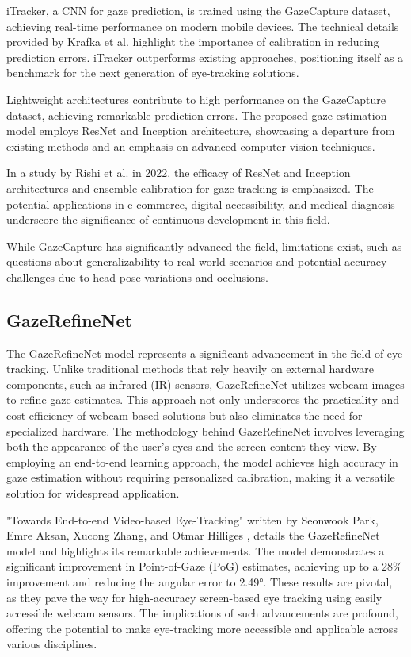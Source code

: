 \documentclass[conference]{IEEEtran}
\begin{document}
iTracker\cite{gazecapture-1}, a CNN for gaze prediction, is trained using the GazeCapture dataset, achieving real-time performance on modern mobile devices. The technical details provided by Krafka et al. highlight the importance of calibration in reducing prediction errors\cite{gazecapture-1}. iTracker outperforms existing approaches\cite{review_benchmark}, positioning itself as a benchmark for the next generation of eye-tracking solutions.

Lightweight architectures contribute to high performance on the GazeCapture dataset, achieving remarkable prediction errors. The proposed gaze estimation model employs ResNet and Inception architecture\cite{gazecapture-2}, showcasing a departure from existing methods and an emphasis on advanced computer vision techniques. 

In a study by Rishi et al. in 2022, the efficacy of ResNet and Inception architectures\cite{gazecapture-2} and ensemble calibration for gaze tracking is emphasized. The potential applications in e-commerce, digital accessibility, and medical diagnosis underscore the significance of continuous development in this field.

While GazeCapture\cite{gazecapture-1} has significantly advanced the field, limitations exist, such as questions about generalizability to real-world scenarios and potential accuracy challenges due to head pose variations\cite{gazecapture-1} and occlusions. 

\subsection{GazeRefineNet}

The GazeRefineNet \cite{grn1} model represents a significant advancement in the field of eye tracking. Unlike traditional methods that rely heavily on external hardware components, such as infrared (IR) sensors, GazeRefineNet utilizes webcam images to refine gaze estimates. This approach not only underscores the practicality and cost-efficiency of webcam-based solutions but also eliminates the need for specialized hardware. The methodology behind GazeRefineNet involves leveraging both the appearance of the user’s eyes and the screen content they view. By employing an end-to-end learning approach, the model achieves high accuracy in gaze estimation without requiring personalized calibration, making it a versatile solution for widespread application. 

"Towards End-to-end Video-based Eye-Tracking" written by Seonwook Park, Emre Aksan, Xucong Zhang, and Otmar Hilliges \cite{grn1}, details the GazeRefineNet model and highlights its remarkable achievements. The model demonstrates a significant improvement in Point-of-Gaze (PoG) estimates, achieving up to a 28\% improvement and reducing the angular error to 2.49°. These results are pivotal, as they pave the way for high-accuracy screen-based eye tracking using easily accessible webcam sensors. The implications of such advancements are profound, offering the potential to make eye-tracking more accessible and applicable across various disciplines.
\end{document}
